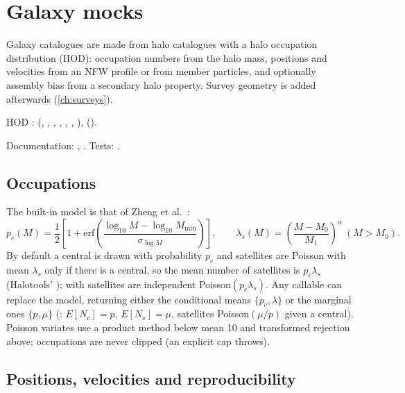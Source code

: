 \chapter{Galaxy mocks}\label{ch:galaxy-mocks}

Galaxy catalogues are made from halo catalogues with a halo occupation distribution (HOD): occupation numbers from the halo
mass, positions and velocities from an NFW profile or from member particles, and optionally assembly bias from a secondary halo
property. Survey geometry is added afterwards (\cref{ch:surveys}).

\begin{modulebox}{HOD}
:  (, , , , ,
, ),  ().\par
Documentation: , . Tests: .
\end{modulebox}

\section{Occupations}\label{sec:hod-occupation}

The built-in model is that of Zheng et al.\ \cite{Zheng2007}:
\begin{equation}
p_c(M)=\frac12\left[1+\mathrm{erf}\left(\frac{\log_{10}M-\log_{10}M_{\min}}{\sigma_{\log M}}\right)\right],\qquad
\lambda_s(M)=\left(\frac{M-M_0}{M_1}\right)^\alpha\ (M>M_0).
\end{equation}
By default a central is drawn with probability $p_c$ and satellites are Poisson with mean $\lambda_s$ only if there is a central, so the mean number
of satellites is $p_c\lambda_s$ (Halotools' ); with  satellites are independent
Poisson$(p_c\lambda_s)$. Any callable can replace the model, returning either the conditional means $\{p_c,\lambda\}$ or the marginal ones
$\{p,\mu\}$ (: $E[N_c]=p$, $E[N_s]=\mu$, satellites Poisson$(\mu/p)$ given a central). Poisson variates use a product
method below mean 10 and transformed rejection above; occupations are never clipped (an explicit cap throws).

\section{Positions, velocities and reproducibility}\label{sec:hod-phase-space}

